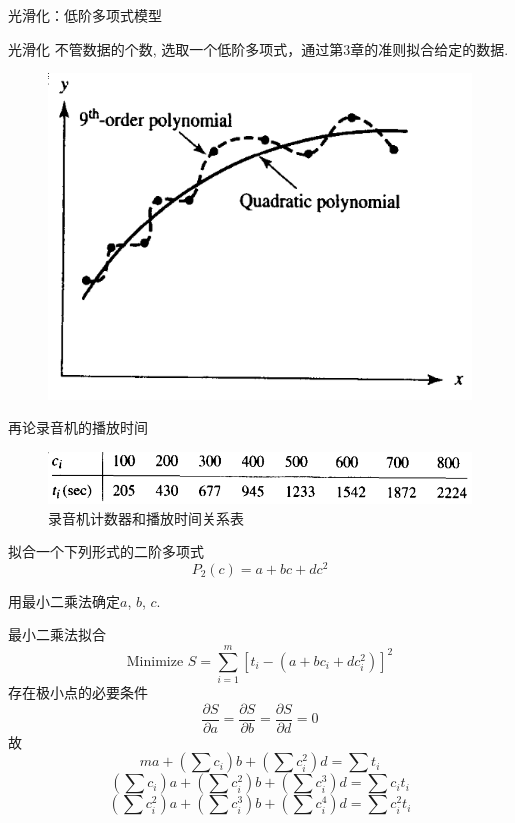 \documentclass[UTF8]{ctexbeamer}
\begin{document}
\begin{frame}{光滑化：低阶多项式模型}

  \begin{block}{光滑化}
    不管数据的个数, 选取一个低阶多项式，通过第3章的准则拟合给定的数据.
  \end{block}

  \begin{figure}
    \centering
    \includegraphics[width=.6\textwidth{}]{smooth.png}
  \end{figure}
  
\end{frame}

\begin{frame}{再论录音机的播放时间}

  \begin{figure}
    \centering
    \includegraphics[width=.6\textwidth{}]{record-tab.png}
    \caption{录音机计数器和播放时间关系表}
  \end{figure}

  拟合一个下列形式的二阶多项式
  \[
  P_2(c) = a + bc + dc^2
  \]

  用最小二乘法确定$a$, $b$, $c$.

\end{frame}

\begin{frame}{最小二乘法拟合}
  \[
  \text{Minimize } S = \sum_{i=1}^m [t_i - (a+bc_i+dc_i^2)]^2
  \]
  存在极小点的必要条件
  \[
  \frac{\partial S}{\partial a} = \frac{\partial S}{\partial b} = \frac{\partial S}{\partial d} = 0
  \]
  故
  \[
  ma + (\sum c_i)b + (\sum c_i^2)d = \sum t_i
  \]
  \[
  (\sum c_i)a + (\sum c_i^2)b + (\sum c_i^3)d = \sum c_it_i
  \]
  \[
  (\sum c_i^2)a + (\sum c_i^3)b + (\sum c_i^4)d = \sum c_i^2t_i
  \]
\end{frame}
\end{document}
